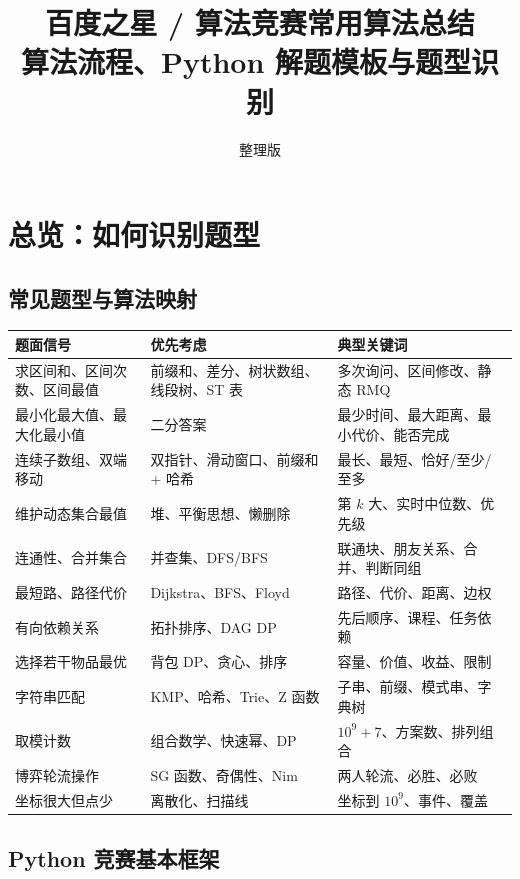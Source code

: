 \documentclass[UTF8,a4paper,14pt]{ctexart}
\title{\textbf{百度之星 / 算法竞赛常用算法总结}\\
\large 算法流程、Python 解题模板与题型识别}
\author{整理版}
\date{}
\begin{document}
\maketitle
\tableofcontents
\newpage

\section{总览：如何识别题型}

\subsection{常见题型与算法映射}

\begin{longtable}{p{}p{}p{}}
\toprule
\textbf{题面信号} & \textbf{优先考虑} & \textbf{典型关键词} \\
\midrule
求区间和、区间次数、区间最值 & 前缀和、差分、树状数组、线段树、ST 表 & 多次询问、区间修改、静态 RMQ \\
最小化最大值、最大化最小值 & 二分答案 & 最少时间、最大距离、最小代价、能否完成 \\
连续子数组、双端移动 & 双指针、滑动窗口、前缀和 + 哈希 & 最长、最短、恰好/至少/至多 \\
维护动态集合最值 & 堆、平衡思想、懒删除 & 第 $k$ 大、实时中位数、优先级 \\
连通性、合并集合 & 并查集、DFS/BFS & 联通块、朋友关系、合并、判断同组 \\
最短路、路径代价 & Dijkstra、BFS、Floyd & 路径、代价、距离、边权 \\
有向依赖关系 & 拓扑排序、DAG DP & 先后顺序、课程、任务依赖 \\
选择若干物品最优 & 背包 DP、贪心、排序 & 容量、价值、收益、限制 \\
字符串匹配 & KMP、哈希、Trie、Z 函数 & 子串、前缀、模式串、字典树 \\
取模计数 & 组合数学、快速幂、DP & $10^9+7$、方案数、排列组合 \\
博弈轮流操作 & SG 函数、奇偶性、Nim & 两人轮流、必胜、必败 \\
坐标很大但点少 & 离散化、扫描线 & 坐标到 $10^9$、事件、覆盖 \\
\bottomrule
\end{longtable}

\subsection{Python 竞赛基本框架}
\end{document}
